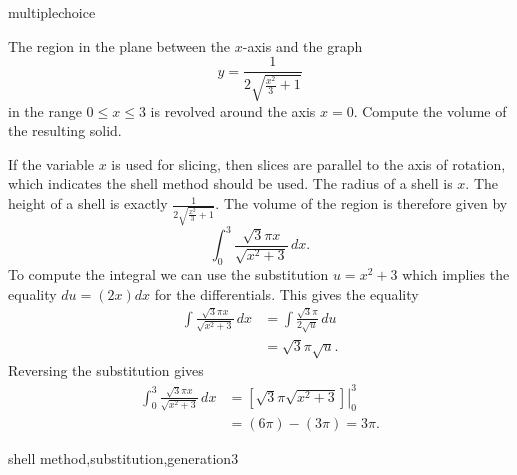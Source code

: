 \documentclass{ximera}
\begin{document}
\begin{question}[shellalgsub2001]
\begin{type}
multiplechoice
\end{type}
The region in the plane between the  \(x\)-axis and the graph
\[ y = \frac{1}{2 \sqrt{\frac{x^{2}}{3} + 1}} \]
 in the range \(0 \leq x \leq 3\) is revolved around the axis \(x = 0\). Compute the volume of the resulting solid.
\begin{multiplechoice}
\choice{\(\displaystyle 2 \pi\)}
\choice[correct]{\(\displaystyle 3 \pi\)}
\choice{\(\displaystyle 5 \pi\)}
\end{multiplechoice}
\begin{feedback}
If the variable \(x\) is used for slicing, then slices are parallel to the axis of rotation, which indicates the shell method should be used.
The radius of a shell is \(x\). The height of a shell is exactly \(\frac{1}{2 \sqrt{\frac{x^{2}}{3} + 1}}\).
The volume of the region is therefore given by
\[ \int_{0}^{3} \frac{\sqrt{3} \pi x}{\sqrt{x^{2} + 3}}\, dx. \]
 To compute the integral we can use the substitution \(u = x^{2} + 3\) which implies the equality \(du = \left(2 x\right)dx\) for the differentials. This gives the equality
\[ \begin{aligned} \int \frac{\sqrt{3} \pi x}{\sqrt{x^{2} + 3}}\, dx & = \int \frac{\sqrt{3} \pi}{2 \sqrt{u}}\, du \\
 & = \sqrt{3} \pi \sqrt{u}. \end{aligned} \]
Reversing the substitution gives
\[ \begin{aligned} \int_{0}^{3} \frac{\sqrt{3} \pi x}{\sqrt{x^{2} + 3}}\, dx & = \left. \left[\sqrt{3} \pi \sqrt{x^{2} + 3} \right] \right|_{0}^{3}\\ & = \left(6 \pi \right) - \left(3 \pi \right) = 3 \pi. \end{aligned} \]
\end{feedback}
\begin{keywords}
shell method,substitution,generation3
\end{keywords}
\end{question}
\end{document}
